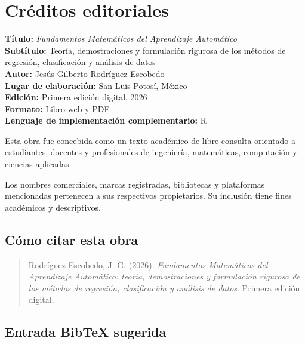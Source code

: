 \documentclass[
  spanish,
  10.5pt,
  letterpaper,
  DIV=11,
  numbers=noendperiod,
  oneside,
  open=any]{scrreprt}
\theoremstyle{definition}
\theoremstyle{definition}
\theoremstyle{plain}
\theoremstyle{remark}
\begin{document}

\chapter*{Créditos editoriales}\label{cruxe9ditos-editoriales}


\textbf{Título:} \emph{Fundamentos Matemáticos del Aprendizaje
Automático}\\
\textbf{Subtítulo:} Teoría, demostraciones y formulación rigurosa de los
métodos de regresión, clasificación y análisis de datos\\
\textbf{Autor:} Jesús Gilberto Rodríguez Escobedo\\
\textbf{Lugar de elaboración:} San Luis Potosí, México\\
\textbf{Edición:} Primera edición digital, 2026\\
\textbf{Formato:} Libro web y PDF\\
\textbf{Lenguaje de implementación complementario:} R

Esta obra fue concebida como un texto académico de libre consulta
orientado a estudiantes, docentes y profesionales de ingeniería,
matemáticas, computación y ciencias aplicadas.

Los nombres comerciales, marcas registradas, bibliotecas y plataformas
mencionadas pertenecen a sus respectivos propietarios. Su inclusión
tiene fines académicos y descriptivos.

\section*{Cómo citar esta obra}\label{cuxf3mo-citar-esta-obra}


\begin{quote}
Rodríguez Escobedo, J. G. (2026). \emph{Fundamentos Matemáticos del
Aprendizaje Automático: teoría, demostraciones y formulación rigurosa de
los métodos de regresión, clasificación y análisis de datos}. Primera
edición digital.
\end{quote}

\section*{Entrada BibTeX sugerida}\label{entrada-bibtex-sugerida}
\end{document}
